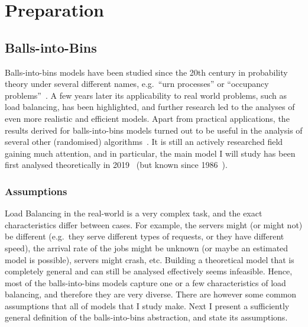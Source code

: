\chapter{Preparation}\label{preparation}

\ifpdf
    \graphicspath{{Chapter2/Figs/Raster/}{Chapter2/Figs/PDF/}{Chapter2/Figs/}}
\else
    \graphicspath{{Chapter2/Figs/Vector/}{Chapter2/Figs/}}
\fi



\section{Balls-into-Bins}


Balls-into-bins models have been studied since the 20th century in probability theory under several different names, e.g.\ ``urn processes'' or ``occupancy problems''~\cite{kolchin1978coined}. A few years later its applicability to real world problems, such as load balancing, has been highlighted, and further research led to the analyses of even more realistic and efficient models. Apart from practical applications, the results derived for balls-into-bins models turned out to be useful in the analysis of several other (randomised) algorithms~\cite{edmonds2006cakecutting}. It is still an actively researched field gaining much attention, and in particular, the main model I will study has been first analysed theoretically in 2019~\cite{dwivedi2019firstthinning} (but known since 1986~\cite{derek1986twothinningfirstattempt}).


\subsection{Assumptions} \label{assumptions}



Load Balancing in the real-world is a very complex task, and the exact characteristics differ between cases. For example, the servers might (or might not) be different (e.g.\ they serve different types of requests, or they have different speed), the arrival rate of the jobs might be unknown (or maybe an estimated model is possible), servers might crash, etc. Building a theoretical model that is completely general and can still be analysed effectively seems infeasible. Hence, most of the balls-into-bins models capture one or a few characteristics of load balancing, and therefore they are very diverse. There are however some common assumptions that all of models that I study make. Next I present a sufficiently general definition of the balls-into-bins abstraction, and state its assumptions. 

